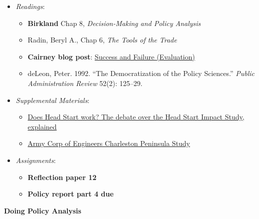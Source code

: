 \begin{itemize}

\item
  \emph{Readings}:

  \begin{itemize}
  
  \item
    \textbf{Birkland} Chap 8, \emph{Decision-Making and Policy Analysis}
  \item
    Radin, Beryl A., Chap 6, \emph{The Tools of the Trade}
  \item
    \textbf{Cairney blog post}:
    \href{https://paulcairney.wordpress.com/2013/12/21/policy-concepts-in-1000-words-success-and-failure-evaluation/}{Success
    and Failure (Evaluation)}
  \item
    deLeon, Peter. 1992. ``The Democratization of the Policy Sciences.''
    \emph{Public Administration Review} 52(2): 125--29.
  \end{itemize}
\item
  \emph{Supplemental Materials}:

  \begin{itemize}
  
  \item
    \href{https://www.brookings.edu/blog/brown-center-chalkboard/2019/06/14/does-head-start-work-the-debate-over-the-head-start-impact-study-explained/?utm_campaign=Brookings\%20Brief\&utm_source=hs_email\&utm_medium=email\&utm_content=73766212}{Does
    Head Start work? The debate over the Head Start Impact Study,
    explained}
  \item
    \href{https://www.sac.usace.army.mil/Missions/Civil-Works/Supplemental-Funding/Charleston-Peninsula-Study/}{Army
    Corp of Engineers Charleston Peninsula Study}
  \end{itemize}
\item
  \emph{Assignments}:

  \begin{itemize}
  
  \item
    \textbf{Reflection paper 12}
  \item
    \textbf{Policy report part 4 due}
  \end{itemize}
\end{itemize}

\week \textbf{Doing Policy Analysis}

